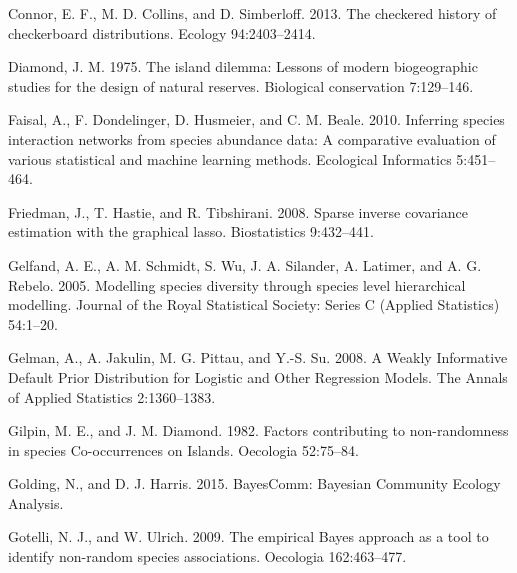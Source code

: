 \documentclass[12pt,]{article}
\begin{document}
\begin{spacing}{1.9}
\begin{flushleft}
Connor, E. F., M. D. Collins, and D. Simberloff. 2013. The checkered
history of checkerboard distributions. Ecology 94:2403--2414.

Diamond, J. M. 1975. The island dilemma: Lessons of modern biogeographic
studies for the design of natural reserves. Biological conservation
7:129--146.

Faisal, A., F. Dondelinger, D. Husmeier, and C. M. Beale. 2010.
Inferring species interaction networks from species abundance data: A
comparative evaluation of various statistical and machine learning
methods. Ecological Informatics 5:451--464.

Friedman, J., T. Hastie, and R. Tibshirani. 2008. Sparse inverse
covariance estimation with the graphical lasso. Biostatistics
9:432--441.

Gelfand, A. E., A. M. Schmidt, S. Wu, J. A. Silander, A. Latimer, and A.
G. Rebelo. 2005. Modelling species diversity through species level
hierarchical modelling. Journal of the Royal Statistical Society: Series
C (Applied Statistics) 54:1--20.

Gelman, A., A. Jakulin, M. G. Pittau, and Y.-S. Su. 2008. A Weakly
Informative Default Prior Distribution for Logistic and Other Regression
Models. The Annals of Applied Statistics 2:1360--1383.

Gilpin, M. E., and J. M. Diamond. 1982. Factors contributing to
non-randomness in species Co-occurrences on Islands. Oecologia
52:75--84.

Golding, N., and D. J. Harris. 2015. BayesComm: Bayesian Community
Ecology Analysis.

Gotelli, N. J., and W. Ulrich. 2009. The empirical Bayes approach as a
tool to identify non-random species associations. Oecologia
162:463--477.


\end{flushleft}
\end{spacing}
\end{document}

